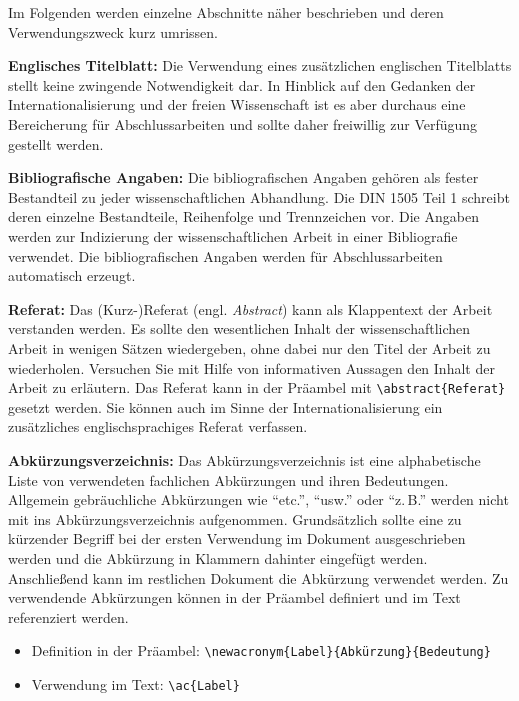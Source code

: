 	Im Folgenden werden einzelne Abschnitte näher beschrieben und deren Verwendungszweck kurz umrissen.
	
	\textbf{Englisches Titelblatt:}\label{itm:englishTitle}
	Die Verwendung eines zusätzlichen englischen Titelblatts stellt keine zwingende Notwendigkeit dar.
	In Hinblick auf den Gedanken der Internationalisierung und der freien Wissenschaft ist es aber durchaus eine Bereicherung für Abschlussarbeiten und sollte daher freiwillig zur Verfügung gestellt werden.
	
	\textbf{Bibliografische Angaben:}\label{itm:bibliographicData}
	Die bibliografischen Angaben gehören als fester Bestandteil zu jeder wissenschaftlichen Abhandlung.
	Die DIN 1505 Teil 1 schreibt deren einzelne Bestandteile, Reihenfolge und Trennzeichen vor.
	Die Angaben werden zur Indizierung der wissenschaftlichen Arbeit in einer Bibliografie verwendet.
	Die bibliografischen Angaben werden für Abschlussarbeiten automatisch erzeugt.
	
	\textbf{Referat:}\label{itm:abstract}
	Das (Kurz-)Referat (engl. \textit{Abstract}) kann als Klappentext der Arbeit verstanden werden.
	Es sollte den wesentlichen Inhalt der wissenschaftlichen Arbeit in wenigen Sätzen wiedergeben, ohne dabei nur den Titel der Arbeit zu wiederholen.
	Versuchen Sie mit Hilfe von informativen Aussagen den Inhalt der Arbeit zu erläutern.
	Das Referat kann in der Präambel mit \verb|\abstract{Referat}| gesetzt werden.
	Sie können auch im Sinne der Internationalisierung ein zusätzliches englischsprachiges Referat verfassen.
	
	\textbf{Abkürzungsverzeichnis:}\label{itm:acronyms}
	Das Abkürzungsverzeichnis ist eine alphabetische Liste von verwendeten fachlichen Abkürzungen und ihren Bedeutungen.
	Allgemein gebräuchliche Abkürzungen wie \enquote{etc.}, \enquote{usw.} oder \enquote{z.\,B.} werden nicht mit ins Abkürzungsverzeichnis aufgenommen.
	Grundsätzlich sollte eine zu kürzender Begriff bei der ersten Verwendung im Dokument ausgeschrieben werden und die Abkürzung in Klammern dahinter eingefügt werden.
	Anschließend kann im restlichen Dokument die Abkürzung verwendet werden.
	Zu verwendende Abkürzungen können in der Präambel definiert und im Text referenziert werden.
	\begin{itemize}
		\item Definition in der Präambel: \verb|\newacronym{Label}{Abkürzung}{Bedeutung}|
		\item Verwendung im Text: \verb|\ac{Label}|
	\end{itemize}
	
